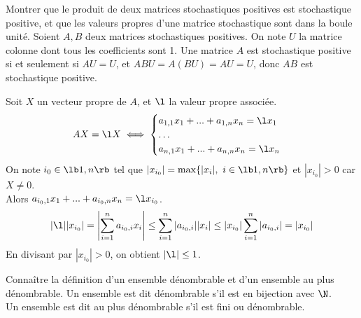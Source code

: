 \documentclass[french, 11pt]{article}
\begin{document}
\begin{question}{}{}
    Montrer que le produit de deux matrices stochastiques positives est stochastique positive, et que les valeurs propres d'une matrice stochastique sont dans la boule unité.
    \tcblower
    Soient $A,B$ deux matrices stochastiques positives. On note $U$ la matrice colonne dont tous les coefficients sont 1.
    Une matrice $A$ est stochastique positive si et seulement si $AU=U$, et $ABU=A(BU)=AU=U$, donc $AB$ est stochastique positive.

    Soit $X$ un vecteur propre de $A$, et $\l$ la valeur propre associée.
    \begin{equation*}
        AX=\l X \iff \begin{cases}a_{1,1}x_1 + ... + a_{1,n}x_n = \l x_1 \\ \dots \\ a_{n,1}x_1 + ... + a_{n,n}x_n = \l x_n\end{cases}
    \end{equation*}
    On note $i_0\in\lb1,n\rb$ tel que $|x_{i_0}|=\max\{|x_i|, ~ i\in\lb1,n\rb\}$ et $|x_{i_0}|>0$ car $X\neq0$.\\
    Alors $a_{i_0,1}x_1 + ... + a_{i_0,n}x_n = \l x_{i_0}$.
    \begin{equation*}
        |\l||x_{i_0}| = \left|\sum_{i=1}^na_{i_0,i}x_i\right| \leq \sum_{i=1}^n |a_{i_0,i}||x_i| \leq |x_{i_0}|\sum_{i=1}^n |a_{i_0,i}| = |x_{i_0}|
    \end{equation*} 
    En divisant par $|x_{i_0}|>0$, on obtient $|\l|\leq 1$.
\end{question}

\begin{question}{}{}
    Connaître la définition d'un ensemble dénombrable et d'un ensemble au plus dénombrable.
    \tcblower
    Un ensemble est dit dénombrable s'il est en bijection avec $\N$.\\
    Un ensemble est dit au plus dénombrable s'il est fini ou dénombrable.
\end{question}

\vspace*{-0.8cm}
\end{document}
